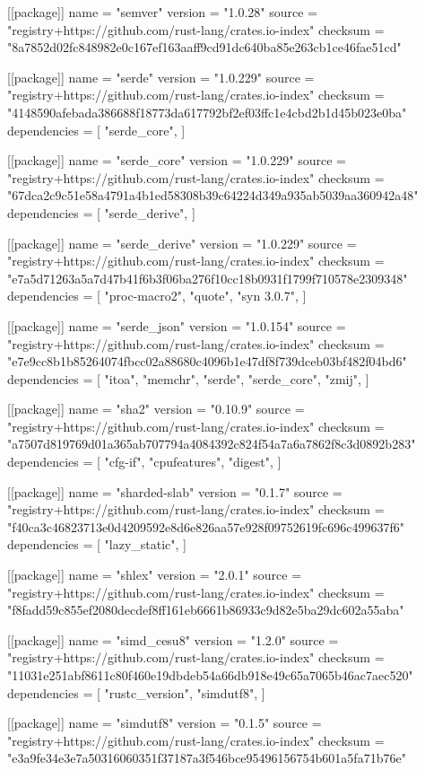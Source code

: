 [[package]]
name = "semver"
version = "1.0.28"
source = "registry+https://github.com/rust-lang/crates.io-index"
checksum = "8a7852d02fc848982e0c167ef163aaff9cd91dc640ba85e263cb1ce46fae51cd"

[[package]]
name = "serde"
version = "1.0.229"
source = "registry+https://github.com/rust-lang/crates.io-index"
checksum = "4148590afebada386688f18773da617792bf2ef03ffc1e4cbd2b1d45b023e0ba"
dependencies = [
 "serde_core",
]

[[package]]
name = "serde_core"
version = "1.0.229"
source = "registry+https://github.com/rust-lang/crates.io-index"
checksum = "67dca2c9c51e58a4791a4b1ed58308b39c64224d349a935ab5039aa360942a48"
dependencies = [
 "serde_derive",
]

[[package]]
name = "serde_derive"
version = "1.0.229"
source = "registry+https://github.com/rust-lang/crates.io-index"
checksum = "e7a5d71263a5a7d47b41f6b3f06ba276f10cc18b0931f1799f710578e2309348"
dependencies = [
 "proc-macro2",
 "quote",
 "syn 3.0.7",
]

[[package]]
name = "serde_json"
version = "1.0.154"
source = "registry+https://github.com/rust-lang/crates.io-index"
checksum = "e7e9cc8b1b85264074fbcc02a88680c4096b1e47df8f739dceb03bf482f04bd6"
dependencies = [
 "itoa",
 "memchr",
 "serde",
 "serde_core",
 "zmij",
]

[[package]]
name = "sha2"
version = "0.10.9"
source = "registry+https://github.com/rust-lang/crates.io-index"
checksum = "a7507d819769d01a365ab707794a4084392c824f54a7a6a7862f8c3d0892b283"
dependencies = [
 "cfg-if",
 "cpufeatures",
 "digest",
]

[[package]]
name = "sharded-slab"
version = "0.1.7"
source = "registry+https://github.com/rust-lang/crates.io-index"
checksum = "f40ca3c46823713e0d4209592e8d6e826aa57e928f09752619fc696c499637f6"
dependencies = [
 "lazy_static",
]

[[package]]
name = "shlex"
version = "2.0.1"
source = "registry+https://github.com/rust-lang/crates.io-index"
checksum = "f8fadd59c855ef2080decdef8ff161eb6661b86933c9d82e5ba29dc602a55aba"

[[package]]
name = "simd_cesu8"
version = "1.2.0"
source = "registry+https://github.com/rust-lang/crates.io-index"
checksum = "11031e251abf8611c80f460e19dbdeb54a66db918e49c65a7065b46ac7aec520"
dependencies = [
 "rustc_version",
 "simdutf8",
]

[[package]]
name = "simdutf8"
version = "0.1.5"
source = "registry+https://github.com/rust-lang/crates.io-index"
checksum = "e3a9fe34e3e7a50316060351f37187a3f546bce95496156754b601a5fa71b76e"

